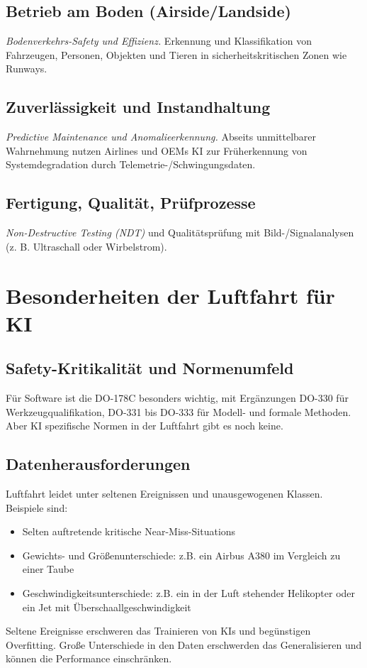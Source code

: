 \subsection{Betrieb am Boden (Airside/Landside)}
\textit{Bodenverkehrs-Safety und Effizienz.}
Erkennung und Klassifikation von Fahrzeugen, Personen, Objekten und Tieren in sicherheitskritischen Zonen wie Runways.
\subsection{Zuverlässigkeit und Instandhaltung}
\textit{Predictive Maintenance und Anomalieerkennung.} 
Abseits unmittelbarer Wahrnehmung nutzen Airlines und OEMs KI zur Früherkennung von Systemdegradation durch Telemetrie-/Schwingungsdaten. 
\subsection{Fertigung, Qualität, Prüfprozesse}
\textit{Non-Destructive Testing (NDT)} und Qualitätsprüfung mit Bild-/Signalanalysen (z. B. Ultraschall oder Wirbelstrom). 

\section{Besonderheiten der Luftfahrt für KI}
\subsection{Safety-Kritikalität und Normenumfeld}
Für Software ist die DO-178C besonders wichtig, mit Ergänzungen DO-330 für Werkzeugqualifikation, 
DO-331 bis DO-333 für Modell- und formale Methoden.
Aber KI spezifische Normen in der Luftfahrt gibt es noch keine.
\subsection{Datenherausforderungen}
Luftfahrt leidet unter seltenen Ereignissen und unausgewogenen Klassen. Beispiele sind:
\begin{itemize}
  \item Selten auftretende kritische Near-Miss-Situations
  \item Gewichts- und Größenunterschiede: z.B. ein Airbus A380 im Vergleich zu einer Taube
  \item Geschwindigkeitsunterschiede: z.B. ein in der Luft stehender Helikopter oder ein Jet mit Überschaallgeschwindigkeit
\end{itemize}
Seltene Ereignisse erschweren das Trainieren von KIs und begünstigen Overfitting. Große Unterschiede in den Daten erschwerden 
das Generalisieren und können die Performance einschränken.
